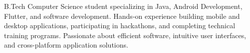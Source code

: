 B.Tech Computer Science student specializing in Java, Android Development, Flutter, and software development. Hands-on experience building mobile and desktop applications, participating in hackathons, and completing technical training programs. Passionate about efficient software, intuitive user interfaces, and cross-platform application solutions.
